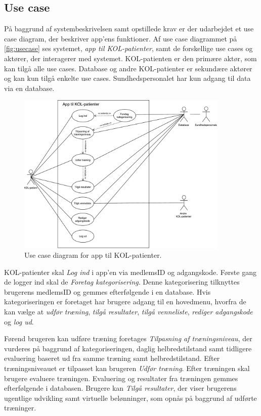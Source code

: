 \subsection{Use case} \label{sec:usecase} 
På baggrund af systembeskrivelsen samt opstillede krav er der udarbejdet et use case diagram, der beskriver app'ens funktioner. Af use case diagrammet på \autoref{fig:usecase} ses systemet, \textit{app til KOL-patienter}, samt de forskellige use cases og aktører, der interagerer med systemet. KOL-patienten er den primære aktør, som kan tilgå alle use cases. Database og andre KOL-patienter er sekundære aktører og kan kun tilgå enkelte use cases. Sundhedspersonalet har kun adgang til data via en database. 

\begin{figure} [H]
\centering
\includegraphics[width=0.9\textwidth]{figures/aktivitetsdiagram/Usecase}
\caption{Use case diagram for app til KOL-patienter.}
\label{fig:usecase}
\end{figure}

\noindent
KOL-patienter skal \textit{Log ind} i app'en via medlemsID og adgangskode. Første gang de logger ind skal de \textit{Foretag kategorisering}. Denne kategorisering tilknyttes brugerens medlemsID og gemmes efterfølgende i en database.
Hvis kategoriseringen er foretaget har brugere adgang til en hovedmenu, hvorfra de kan vælge at \textit{udfør træning}, \textit{tilgå resultater}, \textit{tilgå venneliste}, \textit{rediger adgangskode} og \textit{log ud}. 

Førend brugeren kan udføre træning foretages \textit{Tilpasning af træningsniveau}, der vurderes på baggrund af kategoriseringen, daglig helbredstilstand samt tidligere evaluering baseret ud fra samme træning samt helbredstilstand. Efter træningsniveauet er tilpasset kan brugeren \textit{Udfør træning}. Efter træningen skal brugere evaluere træningen. Evaluering og resultater fra træningen gemmes efterfølgende i databasen. Brugere kan \textit{Tilgå resultater}, der viser brugerens ugentlige udvikling samt virtuelle belønninger, som opnås på baggrund af udførte træninger. 


